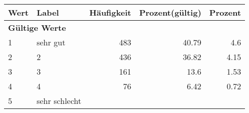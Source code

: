      \begin{longtable}{lXrrr}
     \toprule
     \textbf{Wert} & \textbf{Label} & \textbf{Häufigkeit} & \textbf{Prozent(gültig)} & \textbf{Prozent} \\
     \endhead
     \midrule
     \multicolumn{5}{l}{\textbf{Gültige Werte}}\\

     1 &
     \multicolumn{1}{X}{ sehr gut   } &


       \num{483} &
       \num[round-mode=places,round-precision=2]{40.79} &
         \num[round-mode=places,round-precision=2]{4.6} \\

     2 &
     \multicolumn{1}{X}{ 2   } &


       \num{436} &
       \num[round-mode=places,round-precision=2]{36.82} &
         \num[round-mode=places,round-precision=2]{4.15} \\

     3 &
     \multicolumn{1}{X}{ 3   } &


       \num{161} &
       \num[round-mode=places,round-precision=2]{13.6} &
         \num[round-mode=places,round-precision=2]{1.53} \\

     4 &
     \multicolumn{1}{X}{ 4   } &


       \num{76} &
       \num[round-mode=places,round-precision=2]{6.42} &
         \num[round-mode=places,round-precision=2]{0.72} \\

     5 &
     \multicolumn{1}{X}{ sehr schlecht   } &



\end{longtable}
